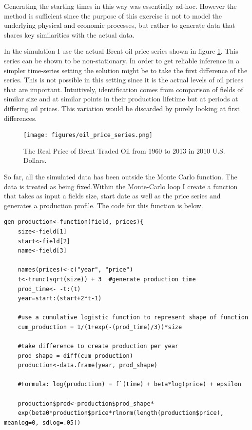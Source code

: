 \documentclass[11pt]{article}
\begin{document}
\begin{spacing}{1}
Generating the starting times in this way was essentially ad-hoc.  However the method is sufficient since the purpose of this exercise is not to model the underlying physical and economic processes, but rather to generate data that shares key similarities with the actual data.

In the simulation I use the actual Brent oil price series shown in figure \ref{oil_price_series}.  This series can be shown to be non-stationary.  In order to get reliable inference in a simpler time-series setting the solution might be to take the first difference of the series.  This is not possible in this setting since it is the actual levels of oil prices that are important.  Intuitively, identification comes from comparison of fields of similar size and at similar points in their production lifetime but at periods at differing oil prices.  This variation would be discarded by purely looking at first differences.

\begin{figure}
	\texttt{[image: figures/oil\_price\_series.png]}
	\caption{The Real Price of Brent Traded Oil from 1960 to 2013 in 2010 U.S. Dollars.}
	\label{oil_price_series}	
\end{figure}

So far, all the simulated data has been outside the Monte Carlo function.  The data is treated as being fixed.Within the Monte-Carlo loop I create a function that takes as input a fields size, start date as well as the price series and generates a production profile.  The code for this function is below.  

\begin{verbatim}
gen_production<-function(field, prices){
	size<-field[1]
	start<-field[2]
	name<-field[3]

	names(prices)<-c("year", "price")
	t<-trunc(sqrt(size)) + 3  #generate production time
	prod_time<- -t:(t)
	year=start:(start+2*t-1)

	#use a cumulative logistic function to represent shape of function
	cum_production = 1/(1+exp(-(prod_time)/3))*size

	#take difference to create production per year
	prod_shape = diff(cum_production)
	production<-data.frame(year, prod_shape)
	
	#Formula: log(production) = f`(time) + beta*log(price) + epsilon
	
	production$prod<-production$prod_shape*
	exp(beta0*production$price*rlnorm(length(production$price), meanlog=0, sdlog=.05))


\end{verbatim}
\end{spacing}
\end{document}

